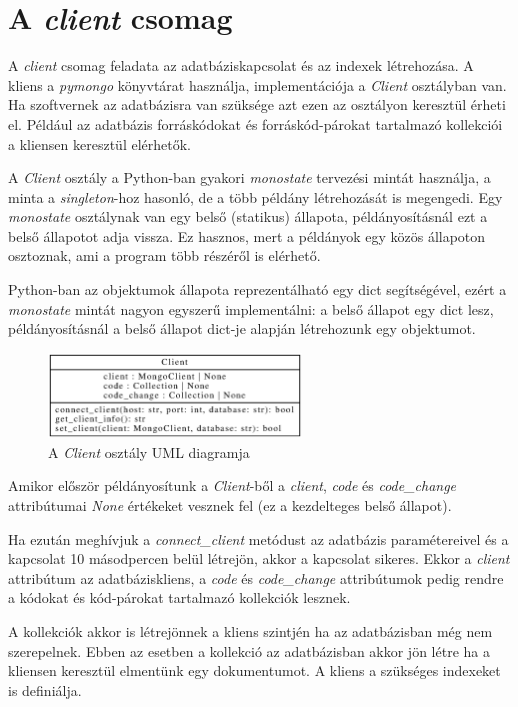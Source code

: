 \section{A \emph{client} csomag}

A \emph{client} csomag feladata az adatbáziskapcsolat és az indexek létrehozása.
A kliens a \emph{pymongo} könyvtárat használja, implementációja a \emph{Client} osztályban van.
Ha szoftvernek az adatbázisra van szüksége azt ezen az osztályon keresztül érheti el.
Például az adatbázis forráskódokat és forráskód-párokat tartalmazó kollekciói a kliensen
keresztül elérhetők.

A \emph{Client} osztály a Python-ban gyakori \emph{monostate} \cite{monostatePattern}
tervezési mintát használja, a minta a \emph{singleton}-hoz hasonló,
de a több példány létrehozását is megengedi.
Egy \emph{monostate} osztálynak van egy belső (statikus) állapota,
példányosításnál ezt a belső állapotot adja vissza.
Ez hasznos, mert a példányok egy közös állapoton osztoznak, ami a program több részéről is elérhető.

Python-ban az objektumok állapota reprezentálható egy dict segítségével,
ezért a \emph{monostate} mintát nagyon egyszerű implementálni:
a belső állapot egy dict lesz, példányosításnál a belső állapot dict-je alapján létrehozunk egy objektumot.

\begin{figure}[H]
	\centering
	\includegraphics[width=0.6\textwidth]{images/uml/Client.eps}
	\caption{A \emph{Client} osztály UML diagramja}
\end{figure}

Amikor először példányosítunk a \emph{Client}-ből a \emph{client}, \emph{code} és \emph{code\_change}
attribútumai \emph{None} értékeket vesznek fel (ez a kezdelteges belső állapot).

Ha ezután meghívjuk a \emph{connect\_client} metódust az adatbázis paramétereivel
és a kapcsolat 10 másodpercen belül létrejön, akkor a kapcsolat sikeres.
Ekkor
a \emph{client} attribútum az adatbáziskliens,
a \emph{code} és \emph{code\_change} attribútumok pedig rendre
a kódokat és kód-párokat tartalmazó kollekciók lesznek.

A kollekciók akkor is létrejönnek a kliens szintjén ha az adatbázisban még nem szerepelnek.
Ebben az esetben a kollekció az adatbázisban akkor jön létre ha a kliensen keresztül elmentünk egy dokumentumot.
A kliens a szükséges indexeket is definiálja.

